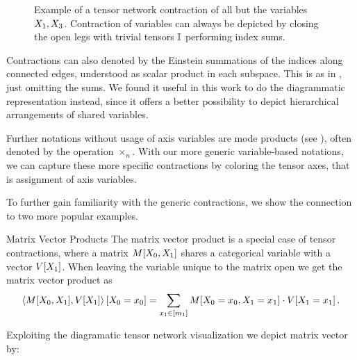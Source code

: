 \begin{figure}
	\begin{center}
		
	\end{center}
	\caption{
		Example of a tensor network contraction of all but the variables $X_{1},X_{3}$.
		Contraction of variables can always be depicted by closing the open legs with trivial tensors $\mathbb{I}$ performing index sums.
	}\label{fig:contraction}
\end{figure}


\begin{remark}[Alternative Notations]
	Contractions can also denoted by the Einstein summations of the indices along connected edges, understood as scalar product in each subspace.
	This is as in , just omitting the sums.
	We found it useful in this work to do the diagrammatic representation instead, since it offers a better possibility to depict hierarchical arrangements of shared variables.
\end{remark}


Further notations without usage of axis variables are mode products (see \cite{kolda_tensor_2009,hackbusch_tensor_2012,cichocki_tensor_2015}), often denoted by the operation $\times_n$.
With our more generic variable-based notations, we can capture these more specific contractions by coloring the tensor axes, that is assignment of axis variables.

To further gain familiarity with the generic contractions, we show the connection to two more popular examples.

\begin{example}{Matrix Vector Products}\label{exa:matrixProduct}
	The matrix vector product is a special case of tensor contractions, where a matrix $M[X_{0},X_{1}]$ shares a categorical variable with a vector $V[X_{1}]$.
	When leaving the variable unique to the matrix open we get the matrix vector product as
		\[ \left\langle M[X_{0},X_{1}],V[X_{1}]\right\rangle \left[ X_{0}=x_{0} \right] = \sum_{x_{1}\in[m_{1}]} M[X_{0}=x_{0},X_{1}=x_{1}] \cdot V[X_{1}=x_{1}] \, .  \]

	Exploiting the diagramatic tensor network visualization we depict matrix vector by: %
	\begin{center}
		
	\end{center}
\end{example}

